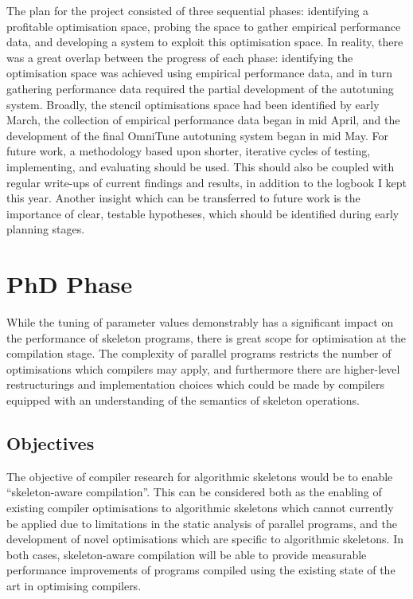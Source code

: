 \documentclass[11pt]{article}
\begin{document}
  The plan for the project consisted of three sequential phases:
  identifying a profitable optimisation space, probing the space to
  gather empirical performance data, and developing a system to exploit
  this optimisation space. In reality, there was a great overlap between
  the progress of each phase: identifying the optimisation space was
  achieved using empirical performance data, and in turn gathering
  performance data required the partial development of the autotuning
  system. Broadly, the stencil optimisations space had been identified
  by early March, the collection of empirical performance data began in
  mid April, and the development of the final OmniTune autotuning system
  began in mid May. For future work, a methodology based upon shorter,
  iterative cycles of testing, implementing, and evaluating should be
  used. This should also be coupled with regular write-ups of current
  findings and results, in addition to the logbook I kept this
  year. Another insight which can be transferred to future work is the
  importance of clear, testable hypotheses, which should be identified
  during early planning
  stages. %



  \section{%
  PhD Phase}

  While the tuning of parameter values demonstrably has a significant
  impact on the performance of skeleton programs, there is great scope
  for optimisation at the compilation stage. The complexity of parallel
  programs restricts the number of optimisations which compilers may
  apply, and furthermore there are higher-level restructurings and
  implementation choices which could be made by compilers equipped with
  an understanding of the semantics of skeleton operations.

  \subsection{Objectives}

  The objective of compiler research for algorithmic skeletons would be
  to enable ``skeleton-aware compilation''. This can be considered both
  as the enabling of existing compiler optimisations to algorithmic
  skeletons which cannot currently be applied due to limitations in the
  static analysis of parallel programs, and the development of novel
  optimisations which are specific to algorithmic skeletons. In both
  cases, skeleton-aware compilation will be able to provide measurable
  performance improvements of programs compiled using the existing state
  of the art in optimising compilers.
\end{document}

